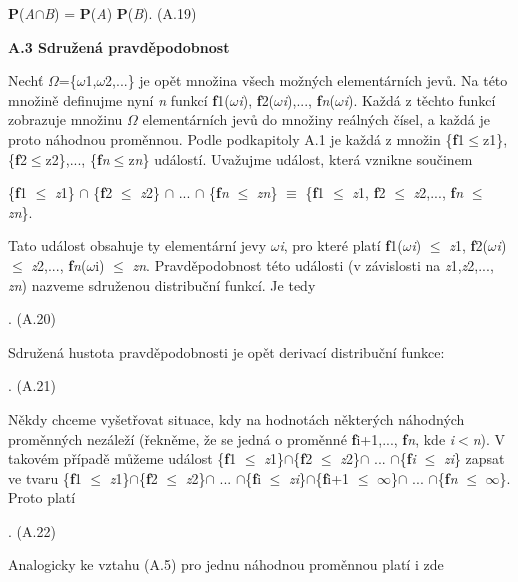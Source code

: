 \textbf{ P}(\textit{A}$\cap$\textit{B}) = \textbf{P}(\textit{A}) \textbf{P}(\textit{B}). (A.19)

\noindent \textbf{A.3  Sdružená pravděpodobnost}

\noindent Nechť $\Omega$=\{$\omega$1,$\omega$2,...\} je opět množina všech možných elementárních jevů. Na této množině definujme nyní \textit{n} funkcí \textbf{f}1($\omega$\textit{i}), \textbf{f}2($\omega$\textit{i}),..., \textbf{f}\textit{n}($\omega$\textit{i}). Každá z těchto funkcí zobrazuje množinu $\Omega$ elementárních jevů do množiny reálných čísel, a každá je proto náhodnou proměnnou. Podle podkapitoly A.1 je každá z množin \{\textbf{f}1$\leq$z1\}, \{\textbf{f}2$\leq$z2\},..., \{\textbf{f}\textit{n}$\leq$z\textit{n}\} událostí. Uvažujme událost, která vznikne součinem

 \{\textbf{f}1 $\leq$ \textit{z}1\} $\cap$ \{\textbf{f}2 $\leq$ \textit{z}2\} $\cap$ ... $\cap$ \{\textbf{f}\textit{n} $\leq$ \textit{zn}\} $\equiv$ \{\textbf{f}1 $\leq$ \textit{z}1, \textbf{f}2 $\leq$ \textit{z}2,..., \textbf{f}\textit{n} $\leq$ \textit{zn}\}.

\noindent Tato událost obsahuje ty elementární jevy $\omega$\textit{i}, pro které platí \textbf{f}1($\omega$\textit{i}) $\leq$ \textit{z}1, \textbf{f}2($\omega$\textit{i}) $\leq$ \textit{z}2,..., \textbf{f}\textit{n}($\omega$i) $\leq$ \textit{zn}.  Pravděpodobnost této události (v závislosti na \textit{z}1,\textit{z}2,..., \textit{zn}) nazveme sdruženou distribuční funkcí. Je tedy

 . (A.20)

\noindent Sdružená hustota pravděpodobnosti je opět derivací distribuční funkce:

 . (A.21)

\noindent Někdy chceme vyšetřovat situace, kdy na hodnotách některých náhodných proměnných nezáleží (řekněme, že se jedná o proměnné \textbf{f}i+1,..., \textbf{f}\textit{n}, kde \textit{i}$<$\textit{n}). V takovém případě můžeme událost \{\textbf{f}1 $\leq$ \textit{z}1\}$\cap$\{\textbf{f}2 $\leq$ \textit{z}2\}$\cap$ ... $\cap$\{\textbf{f}\textit{i} $\leq$ \textit{zi}\} zapsat ve tvaru  \{\textbf{f}1 $\leq$ \textit{z}1\}$\cap$\{\textbf{f}2 $\leq$ \textit{z}2\}$\cap$ ... $\cap$\{\textbf{f}i $\leq$ \textit{zi}\}$\cap$\{\textbf{f}i+1 $\leq$ $\infty$\}$\cap$ ... $\cap$\{\textbf{f}\textit{n} $\leq$ $\infty$\}. Proto platí

 . (A.22)

\noindent Analogicky ke vztahu (A.5) pro jednu náhodnou proměnnou platí i zde

